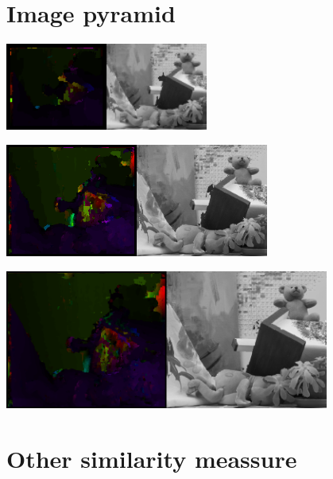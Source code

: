 \documentclass[a4paper]{scrartcl}
\begin{document}
\section{Image pyramid}

\vspace{1cm}
\begin{minipage}{0.8\textwidth}
  \centering
  \includegraphics[width=0.5\textwidth]{images/flow-py-1-it-3.png}
\end{minipage}

\vspace{1cm}
\begin{minipage}{0.8\textwidth}
  \centering
  \includegraphics[width=0.65\textwidth]{images/flow-py-2-it-3.png}
\end{minipage}

\vspace{1cm}
\begin{minipage}{0.8\textwidth}
  \centering
  \includegraphics[width=0.8\textwidth]{images/flow-py-3-it-3.png}
\end{minipage}


\section{Other similarity meassure}
\end{document}
